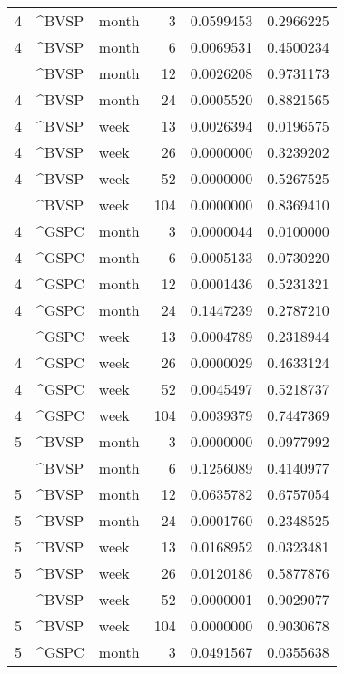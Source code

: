 \begin{tabular}{rllrrr}
4 & \textasciicircum{}BVSP & month & 3 & 0.0599453 & 0.2966225\\
4 & \textasciicircum{}BVSP & month & 6 & 0.0069531 & 0.4500234\\
\addlinespace
4 & \textasciicircum{}BVSP & month & 12 & 0.0026208 & 0.9731173\\
4 & \textasciicircum{}BVSP & month & 24 & 0.0005520 & 0.8821565\\
4 & \textasciicircum{}BVSP & week & 13 & 0.0026394 & 0.0196575\\
4 & \textasciicircum{}BVSP & week & 26 & 0.0000000 & 0.3239202\\
4 & \textasciicircum{}BVSP & week & 52 & 0.0000000 & 0.5267525\\
\addlinespace
4 & \textasciicircum{}BVSP & week & 104 & 0.0000000 & 0.8369410\\
4 & \textasciicircum{}GSPC & month & 3 & 0.0000044 & 0.0100000\\
4 & \textasciicircum{}GSPC & month & 6 & 0.0005133 & 0.0730220\\
4 & \textasciicircum{}GSPC & month & 12 & 0.0001436 & 0.5231321\\
4 & \textasciicircum{}GSPC & month & 24 & 0.1447239 & 0.2787210\\
\addlinespace
4 & \textasciicircum{}GSPC & week & 13 & 0.0004789 & 0.2318944\\
4 & \textasciicircum{}GSPC & week & 26 & 0.0000029 & 0.4633124\\
4 & \textasciicircum{}GSPC & week & 52 & 0.0045497 & 0.5218737\\
4 & \textasciicircum{}GSPC & week & 104 & 0.0039379 & 0.7447369\\
5 & \textasciicircum{}BVSP & month & 3 & 0.0000000 & 0.0977992\\
\addlinespace
5 & \textasciicircum{}BVSP & month & 6 & 0.1256089 & 0.4140977\\
5 & \textasciicircum{}BVSP & month & 12 & 0.0635782 & 0.6757054\\
5 & \textasciicircum{}BVSP & month & 24 & 0.0001760 & 0.2348525\\
5 & \textasciicircum{}BVSP & week & 13 & 0.0168952 & 0.0323481\\
5 & \textasciicircum{}BVSP & week & 26 & 0.0120186 & 0.5877876\\
\addlinespace
5 & \textasciicircum{}BVSP & week & 52 & 0.0000001 & 0.9029077\\
5 & \textasciicircum{}BVSP & week & 104 & 0.0000000 & 0.9030678\\
5 & \textasciicircum{}GSPC & month & 3 & 0.0491567 & 0.0355638\\

\end{tabular}
